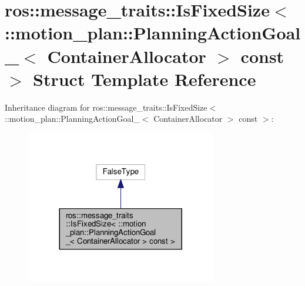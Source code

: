 \hypertarget{structros_1_1message__traits_1_1IsFixedSize_3_01_1_1motion__plan_1_1PlanningActionGoal___3_01Confbbaefb7f3caac8c6364f8ab4c0815b6}{}\section{ros\+:\+:message\+\_\+traits\+:\+:Is\+Fixed\+Size$<$ \+:\+:motion\+\_\+plan\+:\+:Planning\+Action\+Goal\+\_\+$<$ Container\+Allocator $>$ const $>$ Struct Template Reference}
\label{structros_1_1message__traits_1_1IsFixedSize_3_01_1_1motion__plan_1_1PlanningActionGoal___3_01Confbbaefb7f3caac8c6364f8ab4c0815b6}


Inheritance diagram for ros\+:\+:message\+\_\+traits\+:\+:Is\+Fixed\+Size$<$ \+:\+:motion\+\_\+plan\+:\+:Planning\+Action\+Goal\+\_\+$<$ Container\+Allocator $>$ const $>$\+:
\nopagebreak
\begin{figure}[H]
\begin{center}
\leavevmode
\includegraphics[width=236pt]{structros_1_1message__traits_1_1IsFixedSize_3_01_1_1motion__plan_1_1PlanningActionGoal___3_01Con6aede0193b9b2f65824067eab281ebaf}
\end{center}
\end{figure}


